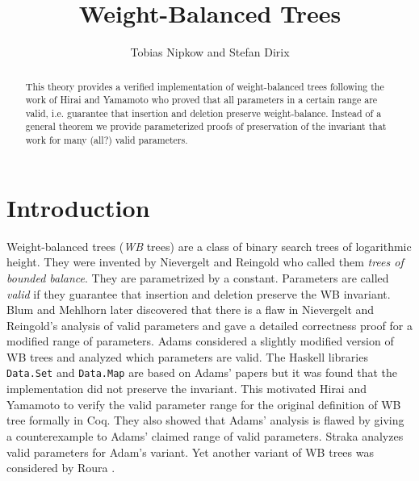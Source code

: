 \documentclass[11pt,a4paper]{article}
\begin{document}
\title{Weight-Balanced Trees}
\author{Tobias Nipkow and Stefan Dirix}
\maketitle

\begin{abstract}
  This theory provides a verified implementation of weight-balanced trees
  following the work of Hirai and Yamamoto \cite{HiraiY11} who proved that all
  parameters in a certain range are valid, i.e. guarantee that insertion and
  deletion preserve weight-balance.  Instead of a general theorem we provide
  parameterized proofs of preservation of the invariant that work for many (all?)
  valid parameters.
\end{abstract}

\section{Introduction}

Weight-balanced trees (\emph{WB} trees) are a class of binary search trees of logarithmic height.
They were invented by Nievergelt and Reingold \cite{NievergeltR72,NievergeltR73}
who called them \emph{trees of bounded balance}. They are parametrized by a constant.
Parameters are called \emph{valid} if they guarantee that insertion and deletion preserve
the WB invariant. Blum and Mehlhorn \cite{BlumM80} later discovered that there is a
flaw in Nievergelt and Reingold's analysis of valid parameters
and gave a detailed correctness proof for a modified range of parameters.
Adams \cite{Adams92,Adams93} considered a slightly modified version
of WB trees and analyzed which parameters are valid.
The Haskell libraries \texttt{Data.Set} and \texttt{Data.Map} are based on Adams' papers
but it was found that the implementation did not preserve the invariant. This motivated
Hirai and Yamamoto \cite{HiraiY11} to verify the valid parameter range for the original
definition of WB tree formally in Coq.
They also showed that Adams' analysis is flawed by giving a counterexample to Adams' claimed
range of valid parameters. Straka \cite{Straka12} analyzes valid parameters for Adam's variant.
Yet another variant of WB trees was considered by Roura \cite{Roura01}.





\end{document}
